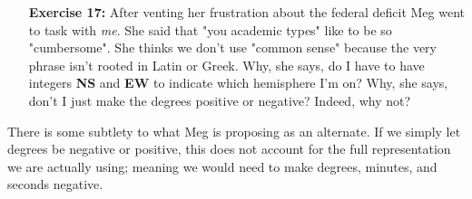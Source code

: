\documentclass[11pt]{article}
\theoremstyle{definition}
\newcommand{\1}[1]{\mathbf{1} \left \{ #1 \right \}}
\begin{document}
\begin{itemize}
\item[{\textbf{Exercise 17:}}] After venting her frustration about the federal deficit Meg went to task with \textit{me}.  She said that "you academic types" like to be so "cumbersome".  She thinks we don't use "common sense" because the very phrase isn't rooted in Latin or Greek.  Why, she says, do I have to have integers \textbf{NS} and \textbf{EW} to indicate which hemisphere I'm on?  Why, she says, don't I just make the degrees positive or negative?  Indeed, why not?
\end{itemize}
There is some subtlety to what Meg is proposing as an alternate.  If we simply let degrees be negative or positive, this does not account for the full representation we are actually using; meaning we would need to make degrees, minutes, and seconds negative.
\end{document}
